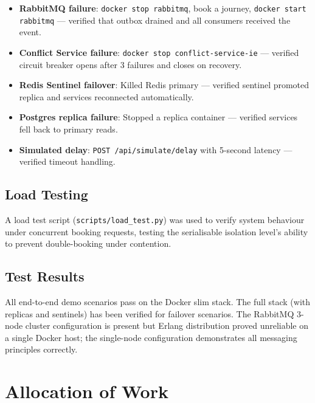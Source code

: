 \documentclass[12pt,a4paper]{article}
\begin{document}
\begin{itemize}[nosep]
  \item \textbf{RabbitMQ failure}: \texttt{docker stop rabbitmq}, book a journey, \texttt{docker start rabbitmq} --- verified that outbox drained and all consumers received the event.
  \item \textbf{Conflict Service failure}: \texttt{docker stop conflict-service-ie} --- verified circuit breaker opens after 3 failures and closes on recovery.
  \item \textbf{Redis Sentinel failover}: Killed Redis primary --- verified sentinel promoted replica and services reconnected automatically.
  \item \textbf{Postgres replica failure}: Stopped a replica container --- verified services fell back to primary reads.
  \item \textbf{Simulated delay}: \texttt{POST /api/simulate/delay} with 5-second latency --- verified timeout handling.
\end{itemize}

\subsection{Load Testing}

A load test script (\texttt{scripts/load\_test.py}) was used to verify system behaviour under concurrent booking requests, testing the serialisable isolation level's ability to prevent double-booking under contention.

\subsection{Test Results}

All end-to-end demo scenarios pass on the Docker slim stack. The full stack (with replicas and sentinels) has been verified for failover scenarios. The RabbitMQ 3-node cluster configuration is present but Erlang distribution proved unreliable on a single Docker host; the single-node configuration demonstrates all messaging principles correctly.

\section{Allocation of Work}
\end{document}
